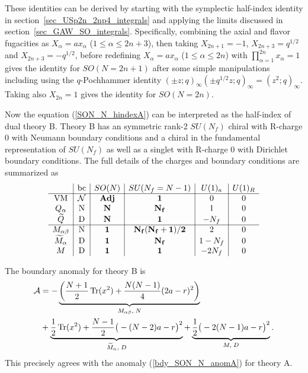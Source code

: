 \documentclass[12pt]{article}
\newcommand{\Acal}{\mathcal{A}}
\DeclareMathOperator*{\Tr}{{\rm Tr}}
\numberwithin{equation}{section}
\begin{document}
These identities can be derived by 
starting with the symplectic half-index identity in section~\ref{sec_USp2n_2np4_integrals} and applying the limits \cite{MR1139492} discussed in section~\ref{sec_GAW_SO_integrals}. 
Specifically, combining the axial and flavor fugacities as $X_{\alpha} = a x_{\alpha}$ ($1 \le \alpha \le 2n+3$), then taking $X_{2n+1} = -1$, $X_{2n+3} = q^{1/2}$ and $X_{2n+3} = -q^{1/2}$, before redefining $X_{\alpha} = a x_{\alpha}$ ($1 \le \alpha \le 2n$) with $\prod_{\alpha = 1}^{2n} x_{\alpha} = 1$ gives the identity for $SO(N = 2n+1)$ after some simple manipulations including using the $q$-Pochhammer identity $(\pm z; q)_{\infty} (\pm q^{1/2}z; q)_{\infty} = (z^2; q)_{\infty}$. Taking also $X_{2n} = 1$ gives the identity for $SO(N = 2n)$. 

Now the equation (\ref{SON_N_hindexA}) can be interpreted as the half-index of dual theory B. 
Theory B has an symmetric rank-2 $SU(N_f)$ chiral with R-charge $0$
with Neumann boundary conditions and
a chiral in the fundamental representation of $SU(N_f)$ as well as a singlet
with R-charge $0$ with Dirichlet boundary conditions. The full details of the charges and boundary conditions are summarized as
\begin{align}
\label{SON_N_charges}
\begin{array}{c|c|c|c|c|c}
& \textrm{bc} & SO(N) & SU(N_f = N - 1) & U(1)_a & U(1)_R \\ \hline
\textrm{VM} & \mathcal{N} & {\bf Adj} & {\bf 1} & 0 & 0 \\
Q_{\alpha} & \textrm{N} & {\bf N} & {\bf N_f} & 1 & 0 \\
\widetilde{Q} & \textrm{D} & {\bf N} & {\bf 1} & -N_f & 0 \\
 \hline
M_{\alpha \beta} & \textrm{N} & {\bf 1} & {\bf N_f(N_f + 1)/2} & 2 & 0 \\
\widetilde{M}_{\alpha} & \textrm{D} & {\bf 1} & {\bf N_f} & 1 - N_f & 0 \\
M & \textrm{D} & {\bf 1} & {\bf 1} & -2N_f & 0
\end{array}
\end{align}

The boundary anomaly for theory B is 
\begin{align}
\label{bdy_SON_N_anomB}
\Acal & = - \underbrace{\left( \frac{N+1}{2} \Tr(x^2) + \frac{N(N-1)}{4}(2a-r)^2 \right)}_{M_{\alpha \beta}, \; N}
  \nonumber \\
 & + \underbrace{\frac{1}{2} \Tr(x^2) + \frac{N-1}{2}\big( -(N-2)a - r \big)^2}_{\widetilde{M}_{\alpha}, \; D}
  + \underbrace{\frac{1}{2} \big( -2(N-1)a - r \big)^2}_{M, \; D}. 
\end{align}
This precisely agrees with the anomaly (\ref{bdy_SON_N_anomA}) for theory A. 
\end{document}

